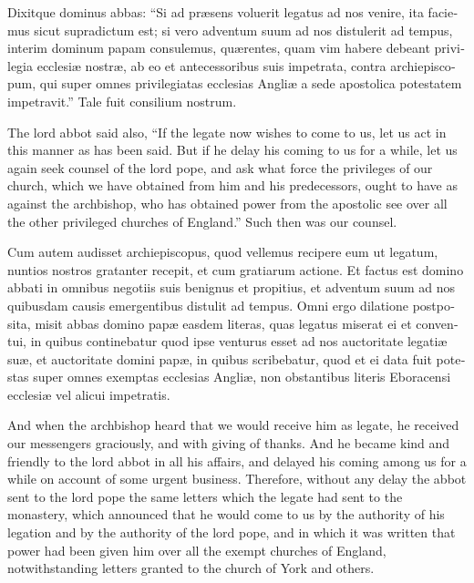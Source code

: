 \documentclass[10pt]{book}
\begin{document}
\begin{paracol}{2}
\switchcolumn*

\begin{otherlanguage}{latin}
Dixitque dominus abbas: ``Si ad pr\ae{}sens voluerit legatus ad nos venire, ita faciemus sicut supradictum est; si vero adventum suum ad nos distulerit ad tempus, interim dominum papam consulemus, qu\ae{}rentes, quam vim habere debeant privilegia ecclesi\ae{} nostr\ae{}, ab eo et antecessoribus suis impetrata, contra archiepiscopum, qui super omnes privilegiatas ecclesias Angli\ae{} a sede apostolica potestatem impetravit.'' Tale fuit consilium nostrum.
\end{otherlanguage}

\switchcolumn

The lord abbot said also, ``If the legate now wishes to come to us, let us act in this manner as has been said. But if he delay his coming to us for a while, let us again seek counsel of the lord pope, and ask what force the privileges of our church, which we have obtained from him and his predecessors, ought to have as against the archbishop, who has obtained power from the apostolic see over all the other privileged churches of England.'' Such then was our counsel.

\switchcolumn*

\begin{otherlanguage}{latin}
Cum autem audisset archiepiscopus, quod vellemus recipere eum ut legatum, nuntios nostros gratanter recepit, et cum gratiarum actione. Et factus est domino abbati in omnibus negotiis suis benignus et propitius, et adventum suum ad nos quibusdam causis emergentibus distulit ad tempus. Omni ergo dilatione postposita, misit abbas domino pap\ae{} easdem literas, quas legatus miserat ei et conventui, in quibus continebatur quod ipse venturus esset ad nos auctoritate legati\ae{} su\ae{}, et auctoritate domini pap\ae{}, in quibus scribebatur, quod et ei data fuit potestas super omnes exemptas ecclesias Angli\ae{}, non obstantibus literis Eboracensi ecclesi\ae{} vel alicui impetratis. 
\end{otherlanguage}

\switchcolumn

And when the archbishop heard that we would receive him as legate, he received our messengers graciously, and with giving of thanks. And he became kind and friendly to the lord abbot in all his affairs, and delayed his coming among us for a while on account of some urgent business. Therefore, without any delay the abbot sent to the lord pope the same letters which the legate had sent to the monastery, which announced that he would come to us by the authority of his legation and by the authority of the lord pope, and in which it was written that power had been given him over all the exempt churches of England, notwithstanding letters granted to the church of York and others.


\end{paracol}
\end{document}
